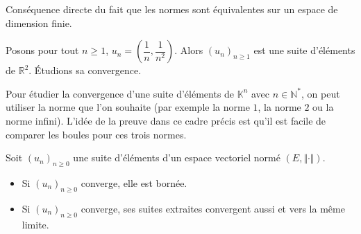 \documentclass[a4paper,10pt]{report}
\begin{document}
\begin{preuve} Conséquence directe du fait que les normes sont équivalentes sur un espace de dimension finie.
\end{preuve}

\begin{ex} Posons pour tout $n \geq 1$, $u_n = \left( \dfrac{1}{n}, \dfrac{1}{n^2} \right)$. Alors $(u_n)_{n \geq 1}$ est une suite d'éléments de $\mathbb{R}^2$. Étudions sa convergence.

%
%
%

\vspace{6cm}
\end{ex}

%

\begin{ex} Pour étudier la convergence d'une suite d'éléments de $\mathbb{K}^n$ avec $n \in \mathbb{N}^*$, on peut utiliser la norme que l'on souhaite (par exemple la norme $1$, la norme $2$ ou la norme infini). L'idée de la preuve dans ce cadre précis est qu'il est facile de comparer les boules pour ces trois normes.
\end{ex}

\begin{prop} Soit $(u_n)_{n \geq 0}$ une suite d'éléments d'un espace vectoriel normé $(E, \Vert \cdot \Vert)$.

\begin{itemize}
\item Si $(u_n)_{n \geq 0}$ converge, elle est bornée.
\item Si $(u_n)_{n \geq 0}$ converge, ses suites extraites convergent aussi et vers la même limite.
\end{itemize}
\end{prop}
\end{document}
